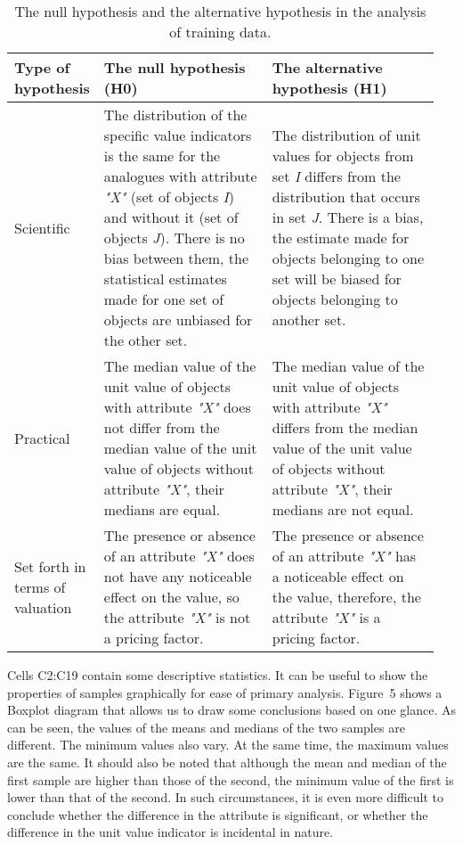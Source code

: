 \documentclass[]{scrreprt}
\begin{document}
\begin{table}[htp]
	\caption{The null hypothesis and the alternative hypothesis in the analysis of training data.}  \label{tab:nul-alt-hypothesis-variants}
	\centering
	\begin{tabularx}{\textwidth}{p{0.15\linewidth} p{0.4\linewidth} p{0.4\linewidth}} 
		\hline
		Type of hypothesis&The null hypothesis (H0)&The alternative hypothesis (H1)\\
		\hline
		Scientific&The distribution of the specific value indicators is the same for the analogues with attribute \textit{"X"} (set of objects \textit{I}) and without it (set of objects \textit{J}). There is no bias between them, the statistical estimates made for one set of objects are unbiased for the other set.&The distribution of unit values for objects from set \textit{I} differs from the distribution that occurs in set \textit{J}. There is a bias, the estimate made for objects belonging to one set will be biased for objects belonging to another set.\\
		\hline
		Practical&The median value of the unit value of objects with attribute \textit{"X"} does not differ from the median value of the unit value of objects without attribute \textit{"X"}, their medians are equal.&The median value of the unit value of objects with attribute \textit{"X"} differs from the median value of the unit value of objects without attribute \textit{"X"}, their medians are not equal.\\
		\hline
		Set forth in terms of valuation&The presence or absence of an attribute  \textit{"X"} does not have any noticeable effect on the value, so the attribute \textit{"X"} is not a pricing factor.&The presence or absence of an attribute \textit{"X"} has a noticeable effect on the value, therefore, the attribute \textit{"X"} is a pricing factor.\\ \hline
	\end{tabularx}
\end{table}
%
Cells C2:C19 contain some descriptive statistics. It can be useful to show the properties of samples graphically for ease of primary analysis. Figure~5 shows a Boxplot diagram that allows us to draw some conclusions based on one glance. As can be seen, the values of the means and medians of the two samples are different. The minimum values also vary. At the same time, the maximum values are the same. It should also be noted that although the mean and median of the first sample are higher than those of the second, the minimum value of the first is lower than that of the second. In such circumstances, it is even more difficult to conclude whether the difference in the attribute is significant, or whether the difference in the unit value indicator is incidental in nature.
\end{document}
